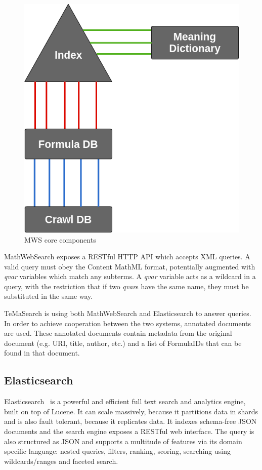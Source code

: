 \documentclass[a4paper,oneside]{article}
\def\mws{\textsf{MathWebSearch}\xspace}
\def\tms{\textsf{TeMaSearch}\xspace}
\def\els{\textsf{Elasticsearch}\xspace}
\def\cmml{\textsf{Content MathML}\xspace}
\def\xml{\textsf{XML}\xspace}
\begin{document}
\begin{figure}[ht]\centering
    \includegraphics[scale=0.3]{img/simple_index.png}
    \caption{MWS core components}\label{fig:simple_index}
\end{figure}
\FloatBarrier

\mws exposes a RESTful HTTP API which accepts \xml queries.
A valid query must obey the \cmml format, potentially augmented with
\emph{qvar} variables which match any subterms.  A \emph{qvar} variable acts as
a wildcard in a query, with the restriction that if two \emph{qvar}s have the
same name, they must be substituted in the same way.

\tms is using both \mws and \els to answer queries.
In order to achieve cooperation between the two systems, annotated documents
are used. These annotated documents contain metadata from the original document
(e.g. URI, title, author, etc.) and a list of \textsf{FormulaID}s that can be
found in that document.

\subsection{Elasticsearch}\label{subsec:prelim:els}
Elasticsearch~\cite{esl:online} is a powerful and efficient full text search
and analytics engine, built on top of Lucene. It can scale massively, because
it partitions data in shards and is also fault tolerant, because it replicates
data.  It indexes schema-free JSON documents and the search engine exposes a
RESTful web interface.  The query is also structured as JSON and supports a
multitude of features via its domain specific language:  nested queries,
filters, ranking, scoring, searching using wildcards/ranges and faceted search.
\end{document}
